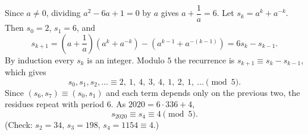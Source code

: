 Since $a\ne0$, dividing $a^2-6a+1=0$ by $a$ gives $a+\dfrac{1}{a}=6$. Let $s_k=a^k+a^{-k}$. Then $s_0=2$, $s_1=6$, and
\[s_{k+1}=\left(a+\dfrac{1}{a}\right)\left(a^k+a^{-k}\right)-\left(a^{k-1}+a^{-(k-1)}\right)=6s_k-s_{k-1}.\]
By induction every $s_k$ is an integer. Modulo $5$ the recurrence is $s_{k+1}\equiv s_k-s_{k-1}$, which gives
\[s_0,s_1,s_2,\dots\equiv2,\ 1,\ 4,\ 3,\ 4,\ 1,\ 2,\ 1,\ \dots\pmod5 .\]
Since $(s_6,s_7)\equiv(s_0,s_1)$ and each term depends only on the previous two, the residues repeat with period $6$. As $2020=6\cdot336+4$,
\[s_{2020}\equiv s_4\equiv\boxed{4}\pmod5 .\]
(Check: $s_2=34$, $s_3=198$, $s_4=1154\equiv4$.)
